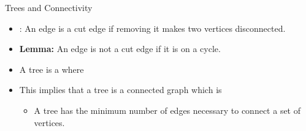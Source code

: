 \begin{frame}{Trees and Connectivity}

  {\larger
    \begin{itemize}
    \item {}: An edge is a cut edge if
      removing it makes two vertices disconnected.

      \bigskip

    \item {\bf Lemma:} An edge is not a cut edge if it is on a
      cycle.

      \bigskip

    \item A tree is a  where

      \bigskip

    \item This implies that a tree is a connected graph which
      is {\bf{}}
      \begin{itemize}
      \item A tree has the minimum number of edges necessary to
        connect a set of vertices.
      \end{itemize}
    \end{itemize}
  }
\end{frame}

